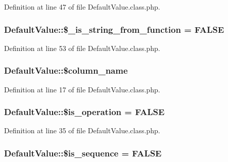 Definition at line 47 of file Default\+Value.\+class.\+php.

\hypertarget{classDefaultValue_a000cf284b962d5c3354abd73b611c888}{
\subsubsection[{\$\+\_\+is\+\_\+string\+\_\+from\+\_\+function}]{\setlength{\rightskip}{0pt plus 5cm}Default\+Value\+::\$\+\_\+is\+\_\+string\+\_\+from\+\_\+function = F\+A\+L\+S\+E}}\label{classDefaultValue_a000cf284b962d5c3354abd73b611c888}


Definition at line 53 of file Default\+Value.\+class.\+php.

\hypertarget{classDefaultValue_a671e32e797e9975b6497a56a5ba92dc6}{
\subsubsection[{\$column\+\_\+name}]{\setlength{\rightskip}{0pt plus 5cm}Default\+Value\+::\$column\+\_\+name}}\label{classDefaultValue_a671e32e797e9975b6497a56a5ba92dc6}


Definition at line 17 of file Default\+Value.\+class.\+php.

\hypertarget{classDefaultValue_ae01855465814b8be26de7bd0b33b6778}{
\subsubsection[{\$is\+\_\+operation}]{\setlength{\rightskip}{0pt plus 5cm}Default\+Value\+::\$is\+\_\+operation = F\+A\+L\+S\+E}}\label{classDefaultValue_ae01855465814b8be26de7bd0b33b6778}


Definition at line 35 of file Default\+Value.\+class.\+php.

\hypertarget{classDefaultValue_a7ad2c3e04c79053b6299c0fa0e35389e}{
\subsubsection[{\$is\+\_\+sequence}]{\setlength{\rightskip}{0pt plus 5cm}Default\+Value\+::\$is\+\_\+sequence = F\+A\+L\+S\+E}}\label{classDefaultValue_a7ad2c3e04c79053b6299c0fa0e35389e}


